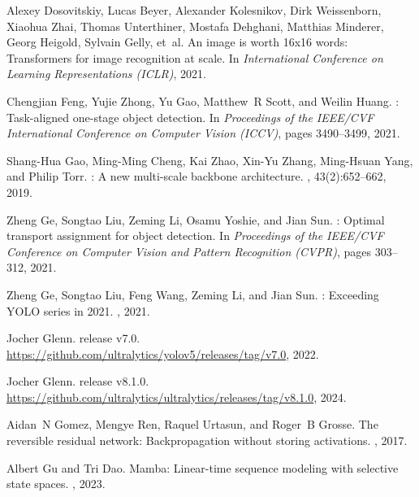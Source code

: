 \documentclass[10pt,twocolumn,letterpaper]{article}
\begin{document}
{\begin{thebibliography}{10}
		Alexey Dosovitskiy, Lucas Beyer, Alexander Kolesnikov, Dirk Weissenborn,
		Xiaohua Zhai, Thomas Unterthiner, Mostafa Dehghani, Matthias Minderer, Georg
		Heigold, Sylvain Gelly, et~al.
		\newblock An image is worth 16x16 words: Transformers for image recognition at
		scale.
		\newblock In {\em International Conference on Learning Representations (ICLR)},
		2021.
		
		Chengjian Feng, Yujie Zhong, Yu Gao, Matthew~R Scott, and Weilin Huang.
		: Task-aligned one-stage object detection.
		\newblock In {\em Proceedings of the IEEE/CVF International Conference on
			Computer Vision (ICCV)}, pages 3490--3499, 2021.
		
		Shang-Hua Gao, Ming-Ming Cheng, Kai Zhao, Xin-Yu Zhang, Ming-Hsuan Yang, and
		Philip Torr.
		: A new multi-scale backbone architecture.
		, 43(2):652--662, 2019.
		
		Zheng Ge, Songtao Liu, Zeming Li, Osamu Yoshie, and Jian Sun.
		: Optimal transport assignment for object detection.
		\newblock In {\em Proceedings of the IEEE/CVF Conference on Computer Vision and
			Pattern Recognition (CVPR)}, pages 303--312, 2021.
		
		Zheng Ge, Songtao Liu, Feng Wang, Zeming Li, and Jian Sun.
		: Exceeding {YOLO} series in 2021.
		, 2021.
		
		Jocher Glenn.
		 release v7.0.
		\newblock \url{https://github.com/ultralytics/yolov5/releases/tag/v7.0}, 2022.
		
		Jocher Glenn.
		 release v8.1.0.
		\newblock \url{https://github.com/ultralytics/ultralytics/releases/tag/v8.1.0},
		2024.
		
		Aidan~N Gomez, Mengye Ren, Raquel Urtasun, and Roger~B Grosse.
		\newblock The reversible residual network: Backpropagation without storing
		activations.
		,
		2017.
		
		Albert Gu and Tri Dao.
		\newblock Mamba: Linear-time sequence modeling with selective state spaces.
		, 2023.
		

\end{thebibliography}}
\end{document}
